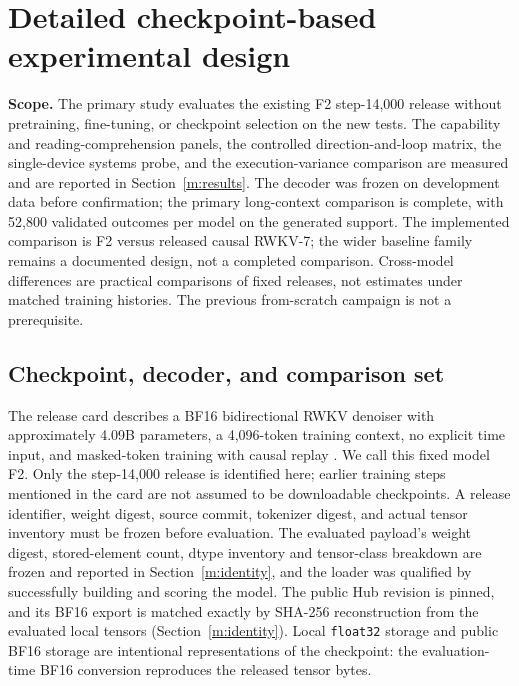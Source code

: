 \section{Detailed checkpoint-based experimental design}
\label{m:experiments}
\textbf{Scope.} The primary study evaluates the existing F2 step-14,000 release without pretraining, fine-tuning, or checkpoint selection on the new tests. The capability and reading-comprehension panels, the controlled direction-and-loop matrix, the single-device systems probe, and the execution-variance comparison are measured and are reported in Section~\ref{m:results}. The decoder was frozen on development data before confirmation; the primary long-context comparison is complete, with 52,800 validated outcomes per model on the generated support. The implemented comparison is F2 versus released causal RWKV-7; the wider baseline family remains a documented design, not a completed comparison. Cross-model differences are practical comparisons of fixed releases, not estimates under matched training histories. The previous from-scratch campaign is not a prerequisite.

\subsection{Checkpoint, decoder, and comparison set}
The release card describes a BF16 bidirectional RWKV denoiser with approximately 4.09B parameters, a 4,096-token training context, no explicit time input, and masked-token training with causal replay \citep{f2release}. We call this fixed model F2. Only the step-14,000 release is identified here; earlier training steps mentioned in the card are not assumed to be downloadable checkpoints. A release identifier, weight digest, source commit, tokenizer digest, and actual tensor inventory must be frozen before evaluation. The evaluated payload's weight digest, stored-element count, dtype inventory and tensor-class breakdown are frozen and reported in Section~\ref{m:identity}, and the loader was qualified by successfully building and scoring the model. The public Hub revision is pinned, and its BF16 export is matched exactly by SHA-256 reconstruction from the evaluated local tensors (Section~\ref{m:identity}). Local \texttt{float32} storage and public BF16 storage are intentional representations of the checkpoint: the evaluation-time BF16 conversion reproduces the released tensor bytes.

